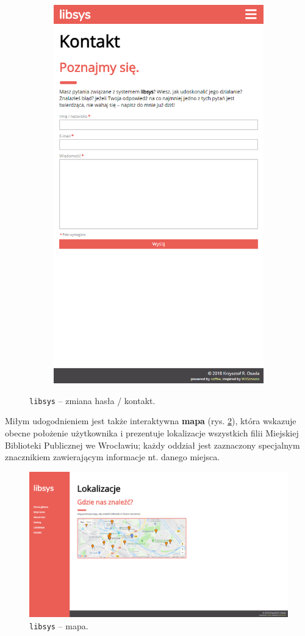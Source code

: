 \documentclass[12pt, a4paper]{article}
\begin{document}
\begin{figure}[h]
\begin{subfigure}{.4\textwidth}
\end{subfigure}\quad
\begin{subfigure}{.4\textwidth}
    \centering
    \includegraphics[width=.75\linewidth]{img/libsys_contact.png}
\end{subfigure}
    \caption{\texttt{libsys} -- zmiana hasła / kontakt.}
    \label{fig:libsys_contact}
\end{figure}

Miłym udogodnieniem jest także interaktywna \textbf{mapa} (rys. \ref{fig:libsys_map}), która wskazuje obecne położenie użytkownika i prezentuje lokalizacje wszystkich filii Miejskiej Biblioteki Publicznej we Wrocławiu; każdy oddział jest zaznaczony specjalnym znacznikiem zawierającym informacje nt. danego miejsca.

\begin{figure}[h]
    \centering
    \includegraphics[width=.75\textwidth]{img/libsys_map.png}
    \caption{\texttt{libsys} -- mapa.}
    \label{fig:libsys_map}
\end{figure}
\end{document}
